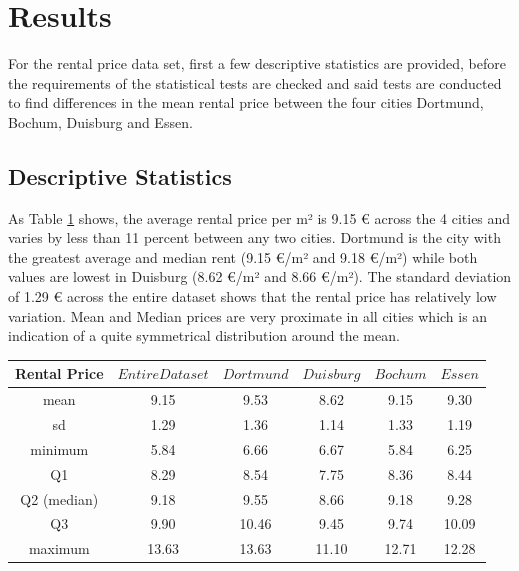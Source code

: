 \documentclass[12 pt]{scrartcl}
\begin{document}
\section{Results}

For the rental price data set, first a few descriptive statistics are provided, before the requirements of the statistical tests are checked and said tests are conducted to find differences in the mean rental price between the four cities Dortmund, Bochum, Duisburg and Essen.

\subsection{Descriptive Statistics}

As Table \ref{tab:descriptives} shows, the average rental price per m² is 9.15 € across the 4 cities and varies by less than 11 percent between any two cities.
Dortmund is the city with the greatest average and median rent (9.15 €/m² and 9.18 €/m²) while both values are lowest in Duisburg (8.62 €/m² and 8.66 €/m²). The standard deviation of 1.29 € across the entire dataset shows that the rental price has relatively low variation. Mean and Median prices are very proximate in all cities which is an indication of a quite symmetrical distribution around the mean.

\begin{table}[ht]
  \centering
  \label{tab:descriptives}
  \begin{tabular}{c|c|cccc}
    Rental Price & $Entire Dataset$ & $Dortmund$ & $Duisburg$ & $Bochum$ & $Essen$ \\
    \hline
    mean         & 9.15             & 9.53       & 8.62       & 9.15     & 9.30    \\
    sd           & 1.29             & 1.36       & 1.14       & 1.33     & 1.19    \\
    minimum      & 5.84             & 6.66       & 6.67       & 5.84     & 6.25    \\
    Q1           & 8.29             & 8.54       & 7.75       & 8.36     & 8.44    \\
    Q2 (median)  & 9.18             & 9.55       & 8.66       & 9.18     & 9.28    \\
    Q3           & 9.90             & 10.46      & 9.45       & 9.74     & 10.09   \\
    maximum      & 13.63            & 13.63      & 11.10      & 12.71    & 12.28
  \end{tabular}
\end{table}
\end{document}
